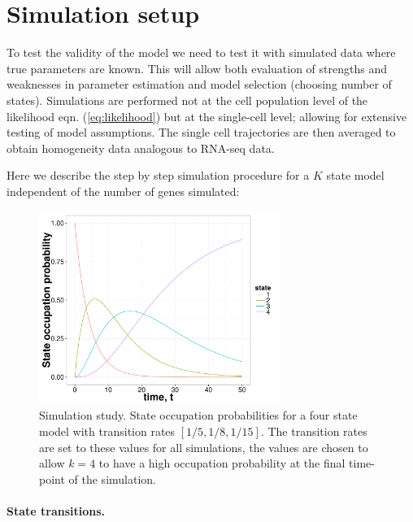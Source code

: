 \section{Simulation setup}
\label{sec:sim-study}

To test the validity of the model we need to test it with simulated data where true parameters are known. This will allow both evaluation of strengths and weaknesses in parameter estimation and model selection (choosing number of states). Simulations are performed not at the cell population level of the likelihood eqn. (\ref{eq:likelihood}) but at the single-cell level; allowing for extensive testing of model assumptions. The single cell trajectories are then averaged to obtain homogeneity data analogous to RNA-seq data.

Here we describe the step by step simulation procedure for a $K$ state model independent of the number of genes simulated:

\begin{figure}
  \centering
  \includegraphics[width=0.7\textwidth]{pics/trans-rates.pdf}
  \caption{Simulation study. State occupation probabilities for a four state model with transition rates $[1/5, 1/8, 1/15]$. The transition rates are set to these values for all simulations, the values are chosen to allow $k=4$ to have a high occupation probability at the final time-point of the simulation.}
  \label{fig:transition-rates}
\end{figure}

\paragraph{State transitions.}
\label{sec:state-transitions}

